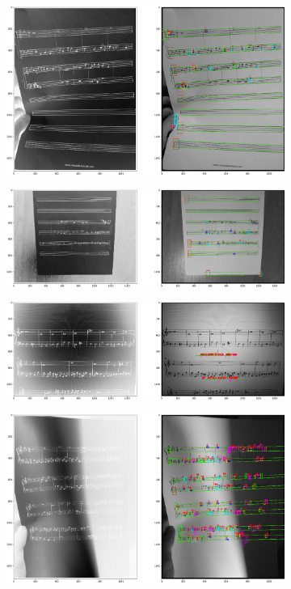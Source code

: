 \documentclass[12pt]{article}
\begin{document}
\begin{enumerate}
			\begin{figure}
				\begin{subfigure}[b]{0.48\linewidth}
					\includegraphics[width=\linewidth]{Hard/Zdj10.png}
				\end{subfigure}
				\begin{subfigure}[b]{0.48\linewidth}
					\includegraphics[width=\linewidth]{Hard/Zdj11.png}
				\end{subfigure}
				\begin{subfigure}[b]{0.48\linewidth}
					\includegraphics[width=\linewidth]{Hard/Zdj12.png}
				\end{subfigure}
				\begin{subfigure}[b]{0.48\linewidth}
					\includegraphics[width=\linewidth]{Hard/Zdj13.png}

\end{subfigure}
\end{figure}
\end{enumerate}
\end{document}
